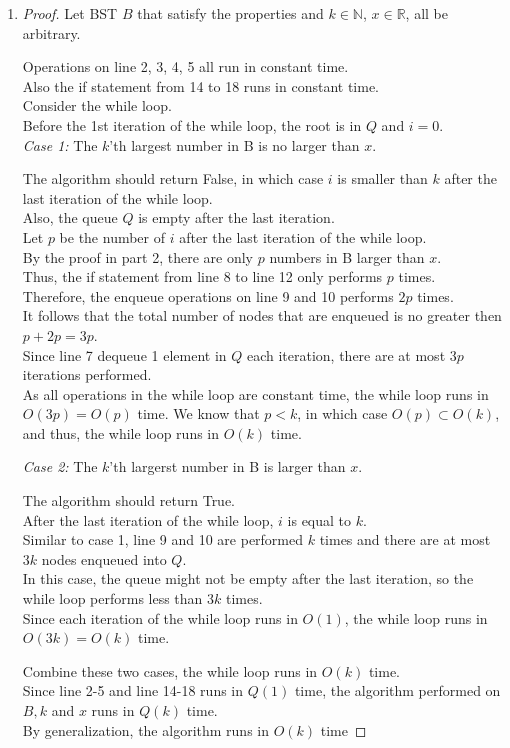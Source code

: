 \documentclass[10pt]{article}
\begin{document}
\begin{enumerate}
\item %
\begin{proof}
Let BST $B$ that satisfy the properties and $k \in \mathbb{N}$, $x \in \mathbb{R}$, all be arbitrary. 

Operations on line 2, 3, 4, 5 all run in constant time. \\
Also the if statement from 14 to 18 runs in constant time. \\

Consider the while loop. \\
Before the 1st iteration of the while loop, the root is in $Q$ and $i = 0$. \\

\textit{Case 1:} The $k$'th largest number in B is no larger than $x$. 
\begin{addmargin}[1em]{0em}
	The algorithm should return False, in which case $i$ is smaller than $k$ after the last iteration of the while loop. \\
	Also, the queue $Q$ is empty after the last iteration. \\
	Let $p$ be the number of $i$ after the last iteration of the while loop. \\
	By the proof in part 2, there are only $p$ numbers in B larger than $x$. \\
	Thus, the if statement from line 8 to line 12 only performs $p$ times. \\
	Therefore, the enqueue operations on line 9 and 10 performs $2p$ times. \\
	It follows that the total number of nodes that are enqueued is no greater then $p+2p = 3p$. \\
	Since line 7 dequeue 1 element in $Q$ each iteration, there are at most $3p$ iterations performed. \\
	As all operations in the while loop are constant time, the while loop runs in $O(3p) = O(p)$ time.
	We know that $p < k$, in which case $O(p) \subset O(k)$, and thus, the while loop runs in $O(k)$ time.
\end{addmargin}
\textit{Case 2:} The $k$'th largerst number in B is larger than $x$. 
\begin{addmargin}[1em]{0em}
	The algorithm should return True. \\
	After the last iteration of the while loop, $i$ is equal to $k$. \\
	Similar to case 1, line 9 and 10 are performed $k$ times and there are at most $3k$ nodes enqueued into $Q$. \\
	In this case, the queue might not be empty after the last iteration, so the while loop performs less than $3k$ times. \\
	Since each iteration of the while loop runs in $O(1)$, the while loop runs in $O(3k) = O(k)$ time.
\end{addmargin}
Combine these two cases, the while loop runs in $O(k)$ time. \\
Since line 2-5 and line 14-18 runs in $Q(1)$ time, the algorithm performed on $B, k$ and $x$ runs in $Q(k)$ time. \\
By generalization, the algorithm runs in $O(k)$ time
\end{proof}


\end{enumerate}
\end{document}
